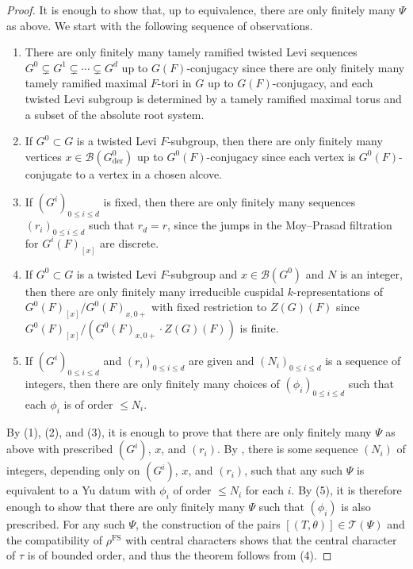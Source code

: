 \documentclass[reqno]{amsart}
\numberwithin{equation}{subsection}
\newcommand\cB{\mathcal{B}}
\newcommand\cT{\mathcal{T}}
\DeclareMathOperator{\FS}{FS}
\DeclareMathOperator{\der}{der}
\theoremstyle{remark}
\numberwithin{equation}{subsection}
\numberwithin{figure}{subsection}
\begin{document}
\begin{proof}
It is enough to show that, up to equivalence, there are only finitely many $\Psi$ as above. We start with the following sequence of observations.
\begin{enumerate}
    \item There are only finitely many tamely ramified twisted Levi sequences $G^0 \subsetneq G^1 \subsetneq \cdots \subsetneq G^d$ up to $G(F)$-conjugacy since there are only finitely many tamely ramified maximal $F$-tori in $G$ up to $G(F)$-conjugacy, and each twisted Levi subgroup is determined by a tamely ramified maximal torus and a subset of the absolute root system.
    \item If $G^0 \subset G$ is a twisted Levi $F$-subgroup, then there are only finitely many vertices $x \in \cB(G^0_{\der})$ up to $G^0(F)$-conjugacy since each vertex is $G^0(F)$-conjugate to a vertex in a chosen alcove.
    \item If $(G^i)_{0\leq i\leq d}$ is fixed, then there are only finitely many sequences $(r_i)_{0\leq i\leq d}$ such that $r_d = r$, since the jumps in the Moy--Prasad filtration for $G^i(F)_{[x]}$ are discrete.
    \item If $G^0 \subset G$ is a twisted Levi $F$-subgroup and $x \in \cB(G^0)$ and $N$ is an integer, then there are only finitely many irreducible cuspidal $k$-representations of $G^0(F)_{[x]}/G^0(F)_{x,0+}$ with fixed restriction to $Z(G)(F)$ since $G^0(F)_{[x]}/(G^0(F)_{x,0+} \cdot Z(G)(F))$ is finite.
    \item If $(G^i)_{0\leq i\leq d}$ and $(r_i)_{0\leq i\leq d}$ are given and $(N_i)_{0\leq i\leq d}$ is a sequence of integers, then there are only finitely many choices of $(\phi_i)_{0\leq i\leq d}$ such that each $\phi_i$ is of order $\leq N_i$.
\end{enumerate}
By (1), (2), and (3), it is enough to prove that there are only finitely many $\Psi$ as above with prescribed $(G^i)$, $x$, and $(r_i)$. By \cite[Lemma~6.6.5]{CF26a}, there is some sequence $(N_i)$ of integers, depending only on $(G^i)$, $x$, and $(r_i)$, such that any such $\Psi$ is equivalent to a Yu datum with $\phi_i$ of order $\leq N_i$ for each $i$. By (5), it is therefore enough to show that there are only finitely many $\Psi$ such that $(\phi_i)$ is also prescribed. For any such $\Psi$, the construction of the pairs $[(T, \theta)] \in \cT(\Psi)$ and the compatibility of $\rho^{\FS}$ with central characters shows that the central character of $\tau$ is of bounded order, and thus the theorem follows from (4).
\end{proof}
\end{document}
